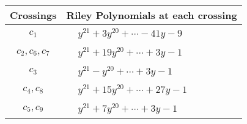 \documentclass[1p]{elsarticle_modified}
\theoremstyle{definition}
\begin{document}
\begin{tabular}{m{50pt}|m{274pt}}
Crossings & \hspace{64pt}Riley Polynomials at each crossing \\
\hline $$\begin{aligned}c_{1}\end{aligned}$$&$\begin{aligned}
&y^{21}+3 y^{20}+\cdots-41 y-9
\end{aligned}$\\
\hline $$\begin{aligned}c_{2},c_{6},c_{7}\end{aligned}$$&$\begin{aligned}
&y^{21}+19 y^{20}+\cdots+3 y-1
\end{aligned}$\\
\hline $$\begin{aligned}c_{3}\end{aligned}$$&$\begin{aligned}
&y^{21}- y^{20}+\cdots+3 y-1
\end{aligned}$\\
\hline $$\begin{aligned}c_{4},c_{8}\end{aligned}$$&$\begin{aligned}
&y^{21}+15 y^{20}+\cdots+27 y-1
\end{aligned}$\\
\hline $$\begin{aligned}c_{5},c_{9}\end{aligned}$$&$\begin{aligned}
&y^{21}+7 y^{20}+\cdots+3 y-1
\end{aligned}$\\
\hline
\end{tabular}
\vskip 2pc
\end{document}
